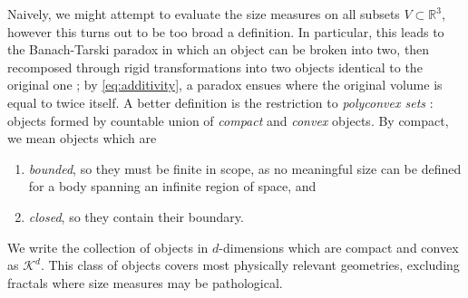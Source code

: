Naively, we might attempt to evaluate the size measures on all subsets $V \subset \mathbb{R}^3$, however this turns out to be too broad a definition.
In particular, this leads to the Banach-Tarski paradox in which an object can be broken into two, then recomposed through rigid transformations into two objects identical to the original one  \cite{BanachFM1924}; by \eqref{eq:additivity}, a paradox ensues where the original volume is equal to twice itself.
A better definition is the restriction to \emph{polyconvex sets}%
: objects formed by countable union of \emph{compact} and \emph{convex} objects.
By compact, we mean objects which are
\begin{enumerate}
\item \emph{bounded}, so they must be finite in scope, as no meaningful size can be defined for a body spanning an infinite region of space, and
\item \emph{closed}, so they contain their boundary.
\end{enumerate}
We write the collection of objects in $d$-dimensions which are compact and convex as $\mathcal{K}^d$.
This class of objects covers most physically relevant geometries, excluding fractals where size measures may be pathological.


